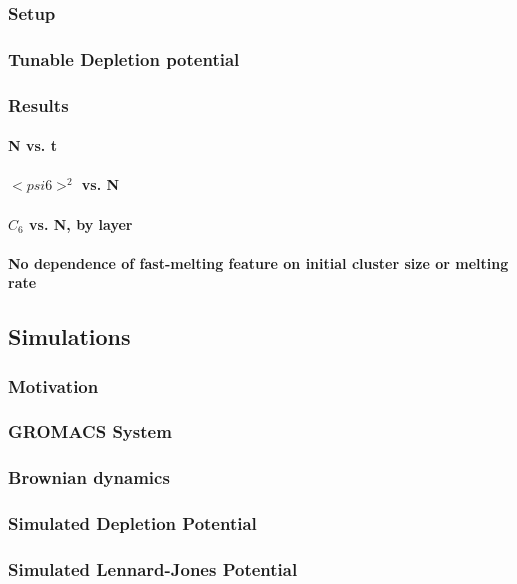 \documentclass[pre,preprint]{revtex4-1}
\begin{document}
\subsubsection{Setup}
\label{sec-1.2.1}
\subsubsection{Tunable Depletion potential}
\label{sec-1.2.2}
\subsubsection{Results}
\label{sec-1.2.3}
\paragraph{N vs. t}
\label{sec-1.2.3.1}
\paragraph{$< psi6 >^2$ vs. N}
\label{sec-1.2.3.2}
\paragraph{$C_6$ vs. N, by layer}
\label{sec-1.2.3.3}
\paragraph{No dependence of fast-melting feature on initial cluster size or melting rate}
\label{sec-1.2.3.4}
\subsection{Simulations}
\label{sec-1.3}
\subsubsection{Motivation}
\label{sec-1.3.1}
\subsubsection{GROMACS System}
\label{sec-1.3.2}
\subsubsection{Brownian dynamics}
\label{sec-1.3.3}
\subsubsection{Simulated Depletion Potential}
\label{sec-1.3.4}
\subsubsection{Simulated Lennard-Jones Potential}
\label{sec-1.3.5}
\end{document}
